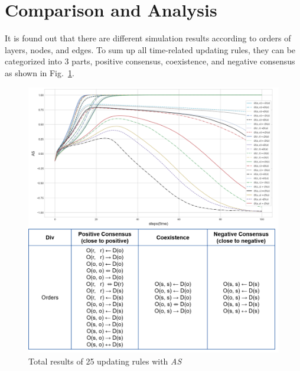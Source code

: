 \section{Comparison and Analysis}
It is found out that there are different simulation results according to orders of layers, nodes, and edges. To sum up all time-related updating rules, they can be categorized into 3 parts, positive consensus, coexistence, and negative consensus as shown in Fig.~\ref{ordertotal}.  
\begin{figure}[!htb]
	\centering
	\includegraphics[width=\hsize]{figure/chap4_ordertotal.png}
	\caption{Total results of 25 updating rules with \textit{AS}}
	\label{ordertotal}
\end{figure}
